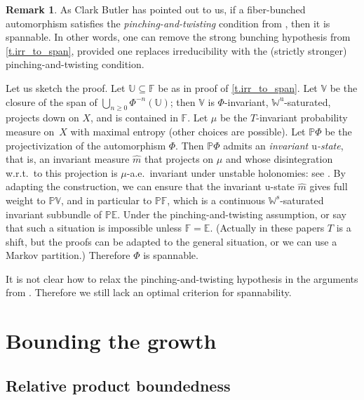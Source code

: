 \documentclass[JEP,XML,SOM,Unicode]{cedram}
\theoremstyle{plain}
\theoremstyle{definition}
\newtheorem{remark}[theorem]{Remark}
\newcommand{\EE}{\mathbb{E}}
\newcommand{\FF}{\mathbb{F}}
\newcommand{\PP}{\mathbb{P}}
\newcommand{\WW}{\mathbb{W}}
\newcommand{\uu}{\mathrm{u}}
\renewcommand{\ss}{\mathrm{s}}
\begin{document}
\begin{remark}\label{r.Clark}
As Clark Butler has pointed out to us, if a fiber-bunched automorphism satisfies the \emph{pinching-and-twisting} condition from \cite[Def.\,1.3]{BV}, \cite[Def.\,1.2]{AV_Portugalia} then it is spannable.
In other words, one can remove the strong bunching hypothesis from \cref{t.irr_to_span}, provided one replaces irreducibility with the (strictly stronger) pinching-and-twisting condition.

Let us sketch the proof.
Let $\mathbb{U} \subseteq \FF$ be as in proof of \cref{t.irr_to_span}.
Let $\mathbb{V}$ be the closure of the span of $\bigcup_{n\ge 0} \Phi^{-n}(\mathbb{U})$; then $\mathbb{V}$ is $\Phi$-invariant, $\WW^\uu$-saturated, projects down on $X$, and is contained in $\FF$.
Let $\mu$ be the $T$-invariant probability measure on~$X$ with maximal entropy (other choices are possible).
Let $\PP\Phi$ be the projectivization of the automorphism $\Phi$.
Then $\PP\Phi$ admits an \emph{invariant $\mathrm{u}$-state}, that is, an invariant measure $\hat m$ that projects on $\mu$ and whose disintegration w.r.t.\ to this projection is $\mu$\nobreakdash-a.e.\
invariant under unstable holonomies: see \cite[\S4.1]{AV_Portugalia}.
By adapting the construction, we can ensure that the invariant $\mathrm{u}$-state $\hat m$ gives full weight to $\PP \mathbb{V}$, and in particular to $\PP\FF$, which is a continuous $\WW^\ss$-saturated invariant subbundle of $\PP\EE$.
Under the pinching-and-twisting assumption, \cite[Prop.\,5.1]{BV} or \cite[Prop.\,5.1]{AV_Portugalia} say that such a situation is impossible unless $\FF = \EE$. (Actually in these papers $T$ is a shift, but the proofs can be adapted to the general situation, or we can use a Markov partition.) Therefore $\Phi$ is spannable.

It is not clear how to relax the pinching-and-twisting hypothesis in the arguments from \cite{BV,AV_Portugalia}.
Therefore we still lack an optimal criterion for spannability.
\end{remark}

\section{Bounding the growth}\label{s.bounded}

\subsection{Relative product boundedness}\label{ss.RPB}
\end{document}
